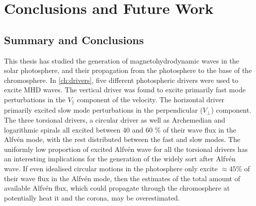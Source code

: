 \documentclass[a4paper,12pt,fourier,authoryear,custommargin]{Classes/PhDThesisPSnPDF}
\begin{document}
\clearpage{}%
%

%
\clearpage{}%

\chapter{Conclusions and Future Work}\label{ch:conclusions}

\section{Summary and Conclusions}

This thesis has studied the generation of magnetohydrodynamic waves in the solar photosphere, and their propagation from the photosphere to the base of the chromosphere.
In \cref{ch:drivers}, five different photospheric drivers were used to excite MHD waves.
The vertical driver was found to excite primarily fast mode perturbations in the $V_\parallel$ component of the velocity.
The horizontal driver primarily excited slow mode perturbations in the perpendicular ($V_\perp$) component.
The three torsional drivers, a circular driver as well as Archemedian and logarithmic spirals all excited between $40$ and $60$ \% of their wave flux in the Alfv\'en mode, with the rest distributed between the fast and slow modes.
The uniformly low proportion of excited Alfv\'en wave for all the torsional drivers has an interesting implications for the generation of the widely sort after Alfv\'en wave.
If even idealised circular motions in the photosphere only excite $\approx 45$\% of their wave flux in the Alfv\'en mode, then the estimates of the total amount of available Alfv\'en flux, which could propagate through the chromosphere at potentially heat it and the corona, may be overestimated.
\end{document}
